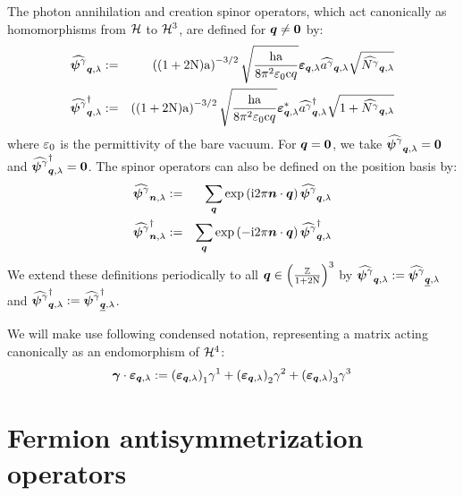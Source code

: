 \documentclass[10pt,a4paper,twoside,openany]{book}
\begin{document}
The photon annihilation and creation spinor operators, which act canonically as homomorphisms from $\H$ to $\H^3$, are defined for $\q \neq \sv 0$ by:
\begin{eqnarray*}
\tSAop \photon \q \sp & \eqdef & \left( ( 1 + 2 \N ) \a \right)^{-3/2} \sqrt{ \frac {\h \a} {8 \pi^2 \vpty \c q} } \photonspin \q \sp \aop \photon \q \sp \sqrt{\Nop \photon \q \sp} \\
\tSCop \photon \q \sp & \eqdef & \left( ( 1 + 2 \N ) \a \right)^{-3/2} \sqrt{ \frac {\h \a} {8 \pi^2 \vpty \c q} } \cphotonspin \q \sp \cop \photon \q \sp \sqrt{1 + \Nop \photon \q \sp}
\end{eqnarray*}
where $\vpty$ is the permittivity of the bare vacuum. For $\q = \sv 0$, we take $\tSAop \photon \q \sp = \sv 0$ and $\tSCop \photon \q \sp = \sv 0$. The spinor operators can also be defined on the position basis by:
\begin{eqnarray*}
\tSAop \photon \n \sp & \eqdef & \sum_{\q} \exp{\i 2 \pi \n \ssp \q} \tSAop \photon \q \sp \\
\tSCop \photon \n \sp & \eqdef & \sum_{\q} \exp{-\i 2 \pi \n \ssp \q} \tSCop \photon \q \sp
\end{eqnarray*}
We extend these definitions periodically to all $\q \in \ILD$ by $\tSAop \photon \q \sp \eqdef \tSAop \photon {\eqp \q} \sp$ and $\tSCop \photon \q \sp \eqdef \tSCop \photon {\eqp \q} \sp$.

We will make use following condensed notation, representing a matrix acting canonically as an endomorphism of $\H^4$:
\begin{equation*}
\gamvec \ssp \photonspin \q \sp \eqdef \svc {(\photonspin \q \sp)} 1 \gammat 1 + \svc {(\photonspin \q \sp)} 2 \gammat 2 + \svc {(\photonspin \q \sp)} 3 \gammat 3
\end{equation*}

\section{Fermion antisymmetrization operators}
\label{Antisymmetrization operators}
\end{document}
